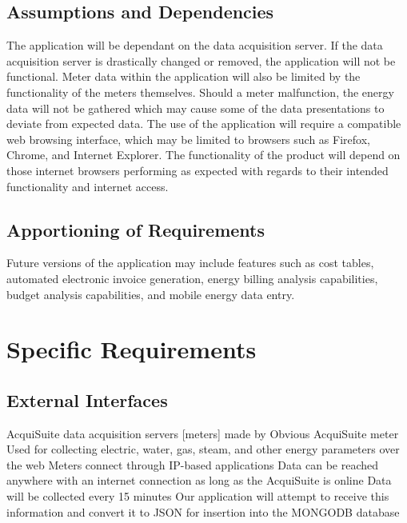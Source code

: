 \documentclass[onecolumn, draftclsnofoot,10pt, compsoc]{IEEEtran}
\begin{document}
    \subsection{Assumptions and Dependencies}
    The application will be dependant on the data acquisition server. If the data acquisition server is drastically changed or removed, the application will not be functional. Meter data within the application will also be limited by the functionality of the meters themselves. Should a meter malfunction, the energy data will not be gathered which may cause some of the data presentations to deviate from expected data. The use of the application will require a compatible web browsing interface, which may be limited to browsers such as Firefox, Chrome, and Internet Explorer. The functionality of the product will depend on those internet browsers performing as expected with regards to their intended functionality and internet access. 

    \subsection{Apportioning of Requirements}
    Future versions of the application may include features such as cost tables, automated electronic invoice generation, energy billing analysis capabilities, budget analysis capabilities, and mobile energy data entry.
    
    \section{Specific Requirements}
    
    \subsection{External Interfaces}
    AcquiSuite data acquisition servers [meters] made by Obvious
    AcquiSuite meter
    Used for collecting electric, water, gas, steam, and other energy parameters over the web
    Meters connect through IP-based applications
    Data can be reached anywhere with an internet connection as long as the AcquiSuite is online
    Data will be collected every 15 minutes
    Our application will attempt to receive this information and convert it to JSON for insertion into the MONGODB database
    
    
\end{document}

